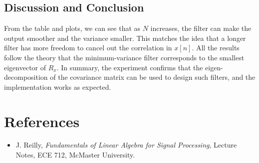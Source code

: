 \documentclass[12pt,a4paper]{article}
\begin{document}
\subsection{Discussion and Conclusion}
From the table and plots, we can see that as $N$ increases, the filter can make the output smoother and the variance smaller.  
This matches the idea that a longer filter has more freedom to cancel out the correlation in $x[n]$.  
All the results follow the theory that the minimum-variance filter corresponds to the smallest eigenvector of $R_x$.  
In summary, the experiment confirms that the eigen-decomposition of the covariance matrix can be used to design such filters, and the implementation works as expected.
\newpage
\section*{References}
\begin{itemize}
    \item J. Reilly, \textit{Fundamentals of Linear Algebra for Signal Processing}, Lecture Notes, ECE 712, McMaster University.
\end{itemize}
\end{document}
